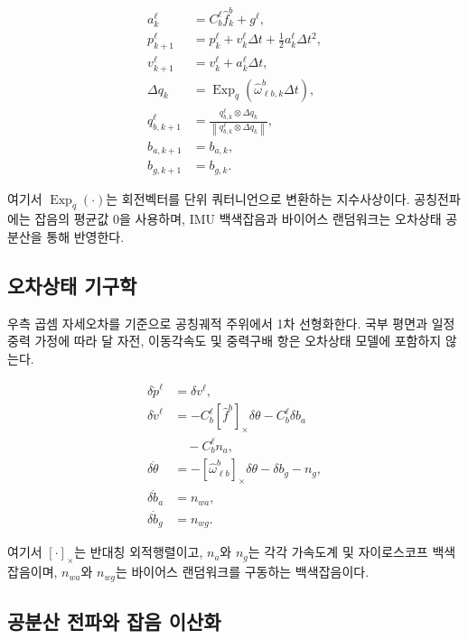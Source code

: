 \documentclass[]{IAC_style}
\begin{document}
\begin{equation}
\tag{20}\label{eq:20}
\begin{aligned}
a_k^\ell &= C_b^\ell\hat f_k^b+g^\ell,\\
p_{k+1}^\ell &=p_k^\ell+v_k^\ell\Delta t
  +\tfrac12a_k^\ell\Delta t^2,\\
v_{k+1}^\ell &=v_k^\ell+a_k^\ell\Delta t,\\
\Delta q_k
  &=\operatorname{Exp}_q\!\left(
    \hat\omega_{\ell b,k}^b\Delta t\right),\\
q_{b,k+1}^\ell
  &=\frac{q_{b,k}^\ell\otimes\Delta q_k}
  {\left\lVert q_{b,k}^\ell\otimes\Delta q_k\right\rVert},\\
b_{a,k+1}&=b_{a,k},\\
b_{g,k+1}&=b_{g,k}.
\end{aligned}
\end{equation}

여기서 $\operatorname{Exp}_q(\cdot)$는 회전벡터를 단위 쿼터니언으로 변환하는 지수사상이다. 공칭전파에는 잡음의 평균값 0을 사용하며, IMU 백색잡음과 바이어스 랜덤워크는 오차상태 공분산을 통해 반영한다.

\subsection{오차상태 기구학}

우측 곱셈 자세오차를 기준으로 공칭궤적 주위에서 1차 선형화한다. 국부 평면과 일정 중력 가정에 따라 달 자전, 이동각속도 및 중력구배 항은 오차상태 모델에 포함하지 않는다.

\begin{equation}
\tag{21}\label{eq:21}
\begin{aligned}
\delta\dot p^\ell&=\delta v^\ell,\\
\delta\dot v^\ell
  &=-C_b^\ell[\hat f^b]_\times\delta\theta-C_b^\ell\delta b_a\\
  &\quad{}-C_b^\ell n_a,\\
\delta\dot\theta
  &=-[\hat\omega_{\ell b}^b]_\times\delta\theta-\delta b_g-n_g,\\
\delta\dot b_a&=n_{wa},\\
\delta\dot b_g&=n_{wg}.
\end{aligned}
\end{equation}

여기서 $[\cdot]_{\times}$는 반대칭 외적행렬이고, $n_a$와 $n_g$는 각각 가속도계 및 자이로스코프 백색잡음이며, $n_{wa}$와 $n_{wg}$는 바이어스 랜덤워크를 구동하는 백색잡음이다.

\subsection{공분산 전파와 잡음 이산화}
\end{document}
